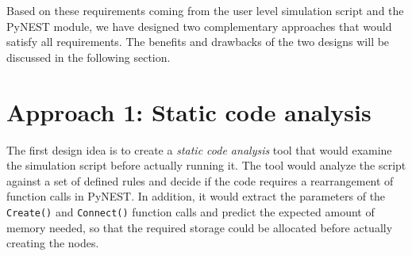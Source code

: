 Based on these requirements coming from the user level simulation script and the PyNEST module, we have designed two complementary approaches that would satisfy all requirements. The benefits and drawbacks of the two designs will be discussed in the following section.

\section{Approach 1: Static code analysis}

The first design idea is to create a \emph{static code analysis} tool that would examine the simulation script before actually running it. The tool would analyze the script against a set of defined rules and decide if the code requires a rearrangement of function calls in PyNEST. In addition, it would extract the parameters of the \texttt{Create()} and \texttt{Connect()} function calls and predict the expected amount of memory needed, so that the required storage could be allocated before actually creating the nodes.

